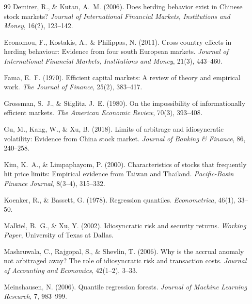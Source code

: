\documentclass[12pt, a4paper]{article}
\begin{document}
\begin{thebibliography}{99}
Demirer, R., \& Kutan, A.~M. (2006).
\newblock Does herding behavior exist in Chinese stock markets?
\newblock \textit{Journal of International Financial Markets, Institutions and Money}, 16(2), 123--142.

Economou, F., Kostakis, A., \& Philippas, N. (2011).
\newblock Cross-country effects in herding behaviour: Evidence from four south European markets.
\newblock \textit{Journal of International Financial Markets, Institutions and Money}, 21(3), 443--460.

Fama, E.~F. (1970).
\newblock Efficient capital markets: A review of theory and empirical work.
\newblock \textit{The Journal of Finance}, 25(2), 383--417.

Grossman, S.~J., \& Stiglitz, J.~E. (1980).
\newblock On the impossibility of informationally efficient markets.
\newblock \textit{The American Economic Review}, 70(3), 393--408.

Gu, M., Kang, W., \& Xu, B. (2018).
\newblock Limits of arbitrage and idiosyncratic volatility: Evidence from China stock market.
\newblock \textit{Journal of Banking \& Finance}, 86, 240--258.

Kim, K.~A., \& Limpaphayom, P. (2000).
\newblock Characteristics of stocks that frequently hit price limits: Empirical evidence from Taiwan and Thailand.
\newblock \textit{Pacific-Basin Finance Journal}, 8(3--4), 315--332.

Koenker, R., \& Bassett, G. (1978).
\newblock Regression quantiles.
\newblock \textit{Econometrica}, 46(1), 33--50.

Malkiel, B.~G., \& Xu, Y. (2002).
\newblock Idiosyncratic risk and security returns.
\newblock \textit{Working Paper}, University of Texas at Dallas.

Mashruwala, C., Rajgopal, S., \& Shevlin, T. (2006).
\newblock Why is the accrual anomaly not arbitraged away? The role of idiosyncratic risk and transaction costs.
\newblock \textit{Journal of Accounting and Economics}, 42(1--2), 3--33.

Meinshausen, N. (2006).
\newblock Quantile regression forests.
\newblock \textit{Journal of Machine Learning Research}, 7, 983--999.


\end{thebibliography}
\end{document}
